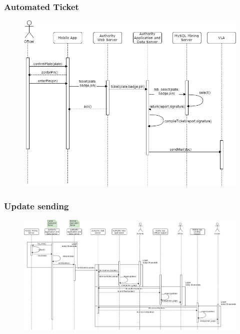 \documentclass[12pt,a4paper]{article}
\begin{document}
		\subsubsection{Automated Ticket}
			\begin{figure}[H]
\begin{adjustwidth}{-25mm}{-25mm}
				\centering
				\includegraphics[width=1.2\textwidth,height=1.2\textheight,keepaspectratio]{Images/automated_ticket}
\end{adjustwidth}				
			\end{figure}
\newpage
		\subsubsection{Update sending}
			\begin{figure}[H]
\begin{adjustwidth}{-25mm}{-25mm}
				\centering
				\includegraphics[width=.9\paperwidth,height=.9\paperheight,keepaspectratio]{Images/update_sending}
\end{adjustwidth}
				
			\end{figure}
\end{document}
